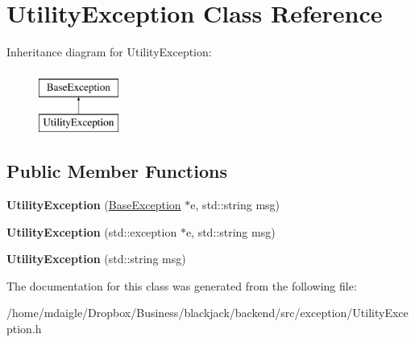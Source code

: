 \hypertarget{classUtilityException}{
\section{\-Utility\-Exception \-Class \-Reference}
\label{dc/df8/classUtilityException}
}
\-Inheritance diagram for \-Utility\-Exception\-:\begin{figure}[H]
\begin{center}
\leavevmode
\includegraphics[height=2.000000cm]{dc/df8/classUtilityException}
\end{center}
\end{figure}
\subsection*{\-Public \-Member \-Functions}
\begin{DoxyCompactItemize}
\item 
\hypertarget{classUtilityException_a30bdb24f45d39023ae8d8b67b19ff450}{
{\bfseries \-Utility\-Exception} (\hyperlink{classBaseException}{\-Base\-Exception} $\ast$e, std\-::string msg)}
\label{dc/df8/classUtilityException_a30bdb24f45d39023ae8d8b67b19ff450}

\item 
\hypertarget{classUtilityException_aabe4627245da479230c9b07fa0d6027a}{
{\bfseries \-Utility\-Exception} (std\-::exception $\ast$e, std\-::string msg)}
\label{dc/df8/classUtilityException_aabe4627245da479230c9b07fa0d6027a}

\item 
\hypertarget{classUtilityException_a5b1231d6d4c4443f2a956457628cf5e2}{
{\bfseries \-Utility\-Exception} (std\-::string msg)}
\label{dc/df8/classUtilityException_a5b1231d6d4c4443f2a956457628cf5e2}

\end{DoxyCompactItemize}


\-The documentation for this class was generated from the following file\-:\begin{DoxyCompactItemize}
\item 
/home/mdaigle/\-Dropbox/\-Business/blackjack/backend/src/exception/\-Utility\-Exception.\-h\end{DoxyCompactItemize}
